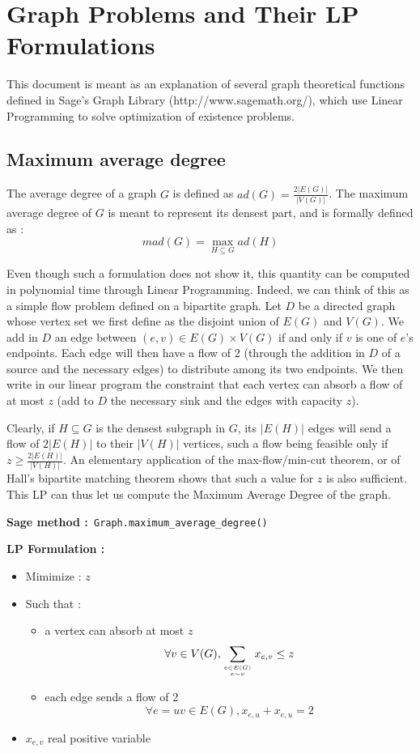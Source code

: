 
\chapter{Graph Problems and Their LP Formulations}

This document is meant as an explanation of several graph theoretical functions defined in Sage's Graph Library (http://www.sagemath.org/), which use Linear Programming to solve optimization of existence problems.



\section{Maximum average degree}
\label{lp:mad}

The average degree of a graph $G$ is defined as $ad(G) = \frac {2|E(G)|}{|V(G)|}$. The maximum average degree of $G$ is meant to represent its densest part, and is formally defined as : $$mad(G) = \max_{H\subseteq G}ad(H)$$

Even though such a formulation does not show it, this quantity can be computed in polynomial time through Linear Programming. Indeed, we can think of this as a simple flow problem defined on a bipartite graph. Let $D$ be a directed graph whose vertex set we first define as the disjoint union of $E(G)$ and $V(G)$. We add in $D$ an edge between $(e,v)\in E(G)\times V(G)$ if and only if $v$ is one of $e$'s endpoints. Each edge will then have a flow of 2 (through the addition in $D$ of a source and the necessary edges) to distribute among its two endpoints. We then write in our linear program the constraint that each vertex can absorb a flow of at most $z$ (add to $D$ the necessary sink and the edges with capacity $z$).

Clearly, if $H\subseteq G$ is the densest subgraph in $G$, its $|E(H)|$ edges will send a flow of $2|E(H)|$ to their $|V(H)|$ vertices, such a flow being feasible only if $z\geq \frac {2|E(H)|}{|V(H)|}$. An elementary application of the max-flow/min-cut theorem, or of Hall's bipartite matching theorem shows that such a value for $z$ is also sufficient. This LP can thus let us compute the Maximum Average Degree of the graph.

{\bf Sage method :}\verb! Graph.maximum_average_degree()!

{\bf LP Formulation :}
\begin{itemize}
\item Mimimize : $z$\\
\item Such that :
  \begin{itemize}
  \item     a vertex can absorb at most $z$
    $$\forall v\in V(G), \sum_{e\in E(G)\atop e\sim v}x_{e,v}\leq z$$
\item each edge sends a flow of 2
  $$\forall e=uv\in E(G), x_{e,u} + x_{e,u} = 2$$
  \end{itemize}
  \item $x_{e,v}$ real positive variable
\end{itemize}

